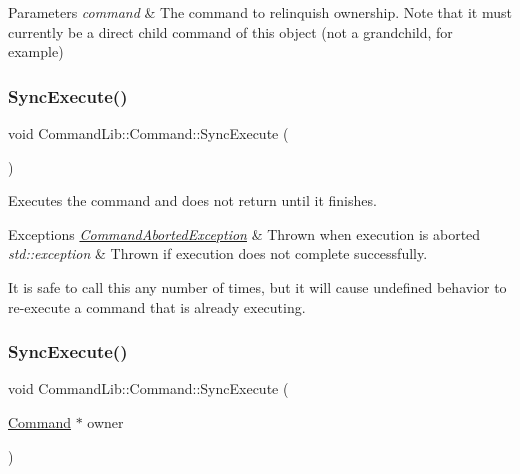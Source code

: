 \begin{DoxyParams}{Parameters}
{\em command} & The command to relinquish ownership. Note that it must currently be a direct child command of this object (not a grandchild, for example)\\
\hline
\end{DoxyParams}
\mbox{\label{class_command_lib_1_1_command_a5d33760ccb927d7f6349c02907ab4ff3}} 
\subsubsection{\texorpdfstring{Sync\+Execute()}{SyncExecute()}\hspace{0.1cm}{\footnotesize\ttfamily [1/2]}}
{\footnotesize\ttfamily void Command\+Lib\+::\+Command\+::\+Sync\+Execute (\begin{DoxyParamCaption}{ }\end{DoxyParamCaption})}



Executes the command and does not return until it finishes.


\begin{DoxyExceptions}{Exceptions}
{\em \mbox{\hyperlink{class_command_lib_1_1_command_aborted_exception}{Command\+Aborted\+Exception}}} & Thrown when execution is aborted\\
\hline
{\em std\+::exception} & Thrown if execution does not complete successfully. \\
\hline
\end{DoxyExceptions}


It is safe to call this any number of times, but it will cause undefined behavior to re-\/execute a command that is already executing. \mbox{\label{class_command_lib_1_1_command_a663d50889f527a4963eebd88bbcdc522}} 
\subsubsection{\texorpdfstring{Sync\+Execute()}{SyncExecute()}\hspace{0.1cm}{\footnotesize\ttfamily [2/2]}}
{\footnotesize\ttfamily void Command\+Lib\+::\+Command\+::\+Sync\+Execute (\begin{DoxyParamCaption}\item[{\mbox{\hyperlink{class_command_lib_1_1_command}{Command}} $\ast$}]{owner }\end{DoxyParamCaption})}



